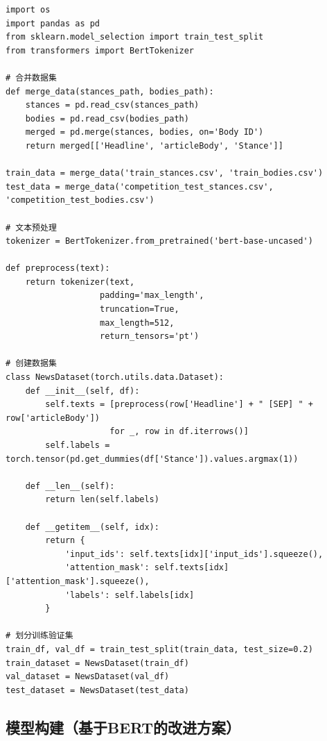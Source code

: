 \documentclass{cjc}
\begin{document}
\begin{verbatim}
import os
import pandas as pd
from sklearn.model_selection import train_test_split
from transformers import BertTokenizer

# 合并数据集
def merge_data(stances_path, bodies_path):
    stances = pd.read_csv(stances_path)
    bodies = pd.read_csv(bodies_path)
    merged = pd.merge(stances, bodies, on='Body ID')
    return merged[['Headline', 'articleBody', 'Stance']]

train_data = merge_data('train_stances.csv', 'train_bodies.csv')
test_data = merge_data('competition_test_stances.csv', 'competition_test_bodies.csv')

# 文本预处理
tokenizer = BertTokenizer.from_pretrained('bert-base-uncased')

def preprocess(text):
    return tokenizer(text, 
                   padding='max_length',
                   truncation=True,
                   max_length=512,
                   return_tensors='pt')

# 创建数据集
class NewsDataset(torch.utils.data.Dataset):
    def __init__(self, df):
        self.texts = [preprocess(row['Headline'] + " [SEP] " + row['articleBody']) 
                     for _, row in df.iterrows()]
        self.labels = torch.tensor(pd.get_dummies(df['Stance']).values.argmax(1))

    def __len__(self):
        return len(self.labels)

    def __getitem__(self, idx):
        return {
            'input_ids': self.texts[idx]['input_ids'].squeeze(),
            'attention_mask': self.texts[idx]['attention_mask'].squeeze(),
            'labels': self.labels[idx]
        }

# 划分训练验证集
train_df, val_df = train_test_split(train_data, test_size=0.2)
train_dataset = NewsDataset(train_df)
val_dataset = NewsDataset(val_df)
test_dataset = NewsDataset(test_data)
\end{verbatim}

\subsection{模型构建（基于BERT的改进方案）}
\end{document}
